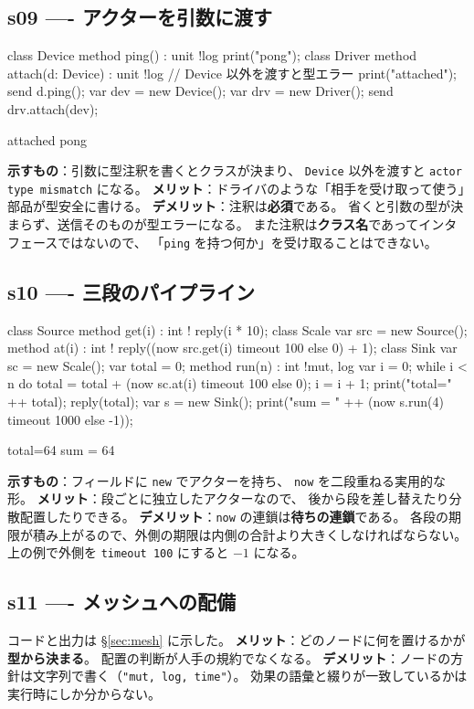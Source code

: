 \documentclass[11pt,a4paper]{ltjsarticle}
\theoremstyle{definition}
\theoremstyle{remark}
\begin{document}
\subsection{s09 ---- アクターを引数に渡す}
\begin{aipl}
class Device { method ping() : unit !{log} { print("pong"); } }
class Driver {
  method attach(d: Device) : unit !{log} {   // Device 以外を渡すと型エラー
    print("attached");
    send d.ping();
  }
}
var dev = new Device();
var drv = new Driver();
send drv.attach(dev);
\end{aipl}
\begin{term}
attached
pong
\end{term}
\textbf{示すもの}：引数に型注釈を書くとクラスが決まり、
\texttt{Device} 以外を渡すと \texttt{actor type mismatch} になる。
\textbf{メリット}：ドライバのような「相手を受け取って使う」部品が型安全に書ける。
\textbf{デメリット}：注釈は\textbf{必須}である。
省くと引数の型が決まらず、送信そのものが型エラーになる。
また注釈は\textbf{クラス名}であってインタフェースではないので、
「\texttt{ping} を持つ何か」を受け取ることはできない。

\subsection{s10 ---- 三段のパイプライン}
\begin{aipl}
class Source { method get(i) : int !{} { reply(i * 10); } }
class Scale  {
  var src = new Source();
  method at(i) : int !{} { reply((now src.get(i) timeout 100 else 0) + 1); }
}
class Sink {
  var sc = new Scale();
  var total = 0;
  method run(n) : int !{mut, log} {
    var i = 0;
    while i < n do {
      total = total + (now sc.at(i) timeout 100 else 0);
      i = i + 1;
    }
    print("total=" ++ total);
    reply(total);
  }
}
var s = new Sink();
print("sum = " ++ (now s.run(4) timeout 1000 else -1));
\end{aipl}
\begin{term}
total=64
sum = 64
\end{term}
\textbf{示すもの}：フィールドに \texttt{new} でアクターを持ち、
\texttt{now} を二段重ねる実用的な形。
\textbf{メリット}：段ごとに独立したアクターなので、
後から段を差し替えたり分散配置したりできる。
\textbf{デメリット}：\texttt{now} の連鎖は\textbf{待ちの連鎖}である。
各段の期限が積み上がるので、外側の期限は内側の合計より大きくしなければならない。
上の例で外側を \texttt{timeout 100} にすると $-1$ になる。

\subsection{s11 ---- メッシュへの配備}
コードと出力は \S\ref{sec:mesh} に示した。
\textbf{メリット}：どのノードに何を置けるかが\textbf{型から決まる}。
配置の判断が人手の規約でなくなる。
\textbf{デメリット}：ノードの方針は文字列で書く（\texttt{"mut, log, time"}）。
効果の語彙と綴りが一致しているかは実行時にしか分からない。
\end{document}
